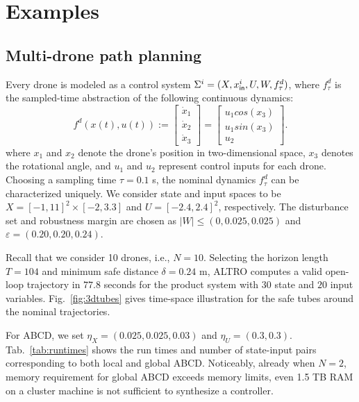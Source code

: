\section{Examples}

\subsection{Multi-drone path planning}\label{sec:Multirobot}

Every drone is modeled as a control system $\Sigma^i=(X,x_{\mathsf{in}}^i,U,W,f^d_\tau)$, 
where $f^d_\tau$ is the sampled-time abstraction of the following continuous dynamics:
\begin{equation*}\label{eq:unicycle_ss}
	f^{d}(x(t),u(t)) :=
	\begin{bmatrix}
		\dot{x}_1\\
		\dot{x}_2\\
		\dot{x}_3
	\end{bmatrix}=
	\begin{bmatrix}
		u_1cos(x_3)\\
		u_1sin(x_3)\\
		u_2
	\end{bmatrix}.
\end{equation*}
where $x_1$ and $x_2$ denote the drone's position in two-dimensional space, $x_3$ denotes the rotational angle, and $u_1$ and $u_2$ represent control inputs for each drone. Choosing a sampling time $\tau=0.1$ s, the nominal dynamics $f^d_\tau$ can be characterized uniquely. 
We consider state and input spaces to be $X=[-1,11]^2\times[-2,3.3]$ and $U=[-2.4,2.4]^2$, respectively. 
The disturbance set and robustness margin are chosen as $|W|\leq (0,0.025,0.025)$ and $\varepsilon=(0.20,0.20,0.24)$.

Recall that we consider 10 drones, i.e., $N = 10$.
Selecting the horizon length $T=104$ and minimum safe distance $\delta=0.24$ m, ALTRO computes a valid open-loop trajectory 
in $77.8$ seconds for the product system with $30$ state and $20$ input variables.  
Fig.~\ref{fig:3dtubes} gives time-space illustration for the safe tubes around the nominal trajectories. 

For ABCD, we set  $\eta_{X}=(0.025,0.025,0.03)$ and $\eta_{U}=(0.3,0.3)$. 
Tab.~\ref{tab:runtimes} shows the run times and number of state-input pairs corresponding to both local and global ABCD. 
Noticeably, already when $N=2$, memory requirement for global ABCD exceeds memory limits, 
even 1.5 TB RAM on a cluster machine is not sufficient to synthesize a controller.


